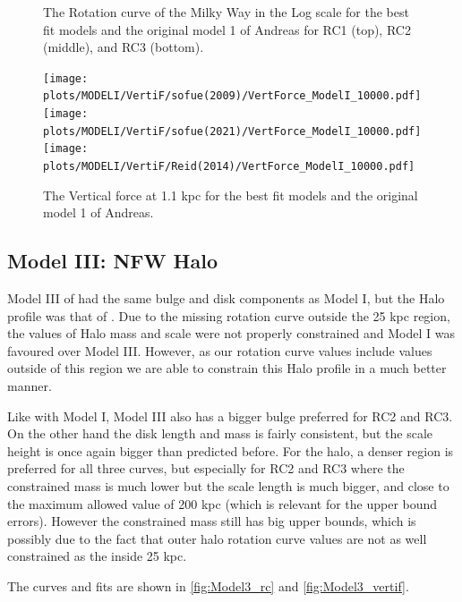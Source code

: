 \documentclass[fleqn,usenatbib]{mnras}
\begin{document}
\begin{figure}
\caption{The Rotation curve of the Milky Way in the Log scale for the best fit models and the original model 1 of Andreas for RC1 (top), RC2 (middle), and RC3 (bottom).
}
\label{fig:Model1_rc}
\end{figure}

\begin{figure}
\texttt{[image: plots/MODELI/VertiF/sofue(2009)/VertForce\_ModelI\_10000.pdf]}
\texttt{[image: plots/MODELI/VertiF/sofue(2021)/VertForce\_ModelI\_10000.pdf]}
\texttt{[image: plots/MODELI/VertiF/Reid(2014)/VertForce\_ModelI\_10000.pdf]}
\caption{The Vertical force at 1.1 kpc for the best fit models and the original model 1 of Andreas.
}
\label{fig:Model1_vertif}
\end{figure}


\subsection{Model III: NFW Halo}

Model III of \citet{andreassmass} had the same bulge and disk components as Model I, but the Halo profile was that of \citet{1997ApJ...490..493N}. Due to the missing rotation curve outside the 25 kpc region, the values of Halo mass and scale were not properly constrained and Model I was favoured over Model III. However, as our rotation curve values include values outside of this region we are able to constrain this Halo profile in a much better manner. 

Like with Model I, Model III also has a bigger bulge preferred for RC2 and RC3. On the other hand the disk length and mass is fairly consistent, but the scale height is once again bigger than predicted before. For the halo, a denser region is preferred for all three curves, but especially for RC2 and RC3 where the constrained mass is much lower but the scale length is much bigger, and close to the maximum allowed value of 200 kpc (which is relevant for the upper bound errors). However the constrained mass still has big upper bounds, which is possibly due to the fact that outer halo rotation curve values are not as well constrained as the inside 25 kpc. 

The curves and fits are shown in \ref{fig:Model3_rc} and \ref{fig:Model3_vertif}.
\end{document}
